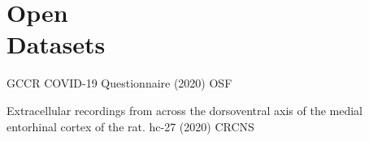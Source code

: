 \documentclass[10pt]{cooperCV2}
\begin{document}
%	










\section{Open\\Datasets}

 
\begin{etaremune}[itemindent=-1.5\bibhang, topsep=0pt,
                   itemsep=\bibsep,partopsep=0pt,parsep=0pt,leftmargin={\bibhang+\widthof{[999]}}] 
    
    \item GCCR COVID-19 Questionnaire (2020) OSF
    
    \item Extracellular recordings from across the dorsoventral axis of the medial entorhinal cortex of the rat. hc-27 (2020) CRCNS
    


\end{etaremune}








%	










\needspace{\headerpush}
\myRule{\columnwidth}{1pt}\\

 
\end{document}
